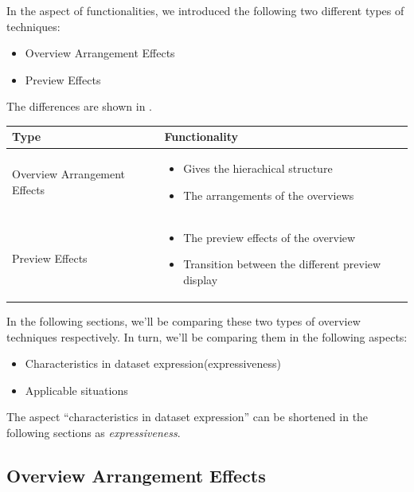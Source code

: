 In the aspect of functionalities, we introduced the following two different types of techniques:

\begin{itemize}
    \item Overview Arrangement Effects
    \item Preview Effects
\end{itemize}

The differences are shown in .

\begingroup
\centering
\begin{tabu} to .97\textwidth { | X[1, r, m] | X[3, l, m] | }
    \hline
    Type & Functionality \\
    \hline\hline
    Overview Arrangement Effects &
    \vspace{.85em}\begin{itemize}
        \item Gives the hierachical structure
        \item The arrangements of the overviews
    \end{itemize} \\
    \hline
    Preview Effects &
    \vspace{.85em}\begin{itemize}
        \item The preview effects of the overview
        \item Transition between the different preview display
    \end{itemize} \\
    \hline
\end{tabu}
\label{tbl:types}
\endgroup

In the following sections, we'll be comparing these two types of overview techniques respectively. In turn, we'll be comparing them in the following aspects:

\begin{itemize}
    \item Characteristics in dataset expression(expressiveness)
    \item Applicable situations
\end{itemize}

The aspect ``characteristics in dataset expression'' can be shortened in the following sections as \emph{expressiveness}.

\subsection{Overview Arrangement Effects}

